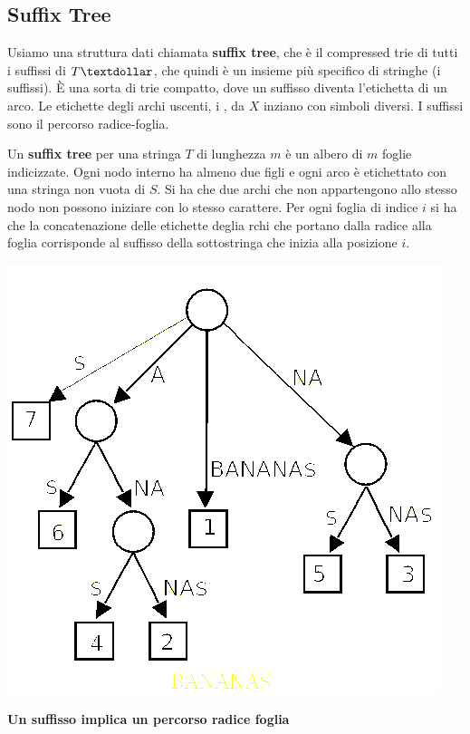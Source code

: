 \documentclass[a4paper,12pt, oneside]{book}
\begin{document}
\subsection{Suffix Tree}
Usiamo una struttura dati chiamata \textbf{suffix tree}, che è il
compressed trie di tutti i suffissi di $T\textdollar$, che quindi è un insieme più specifico di
stringhe (i suffissi). È una sorta di trie compatto, dove un suffisso
diventa l'etichetta di un arco. Le etichette degli archi uscenti, i
, da $X$ inziano con simboli diversi. I suffissi sono il
percorso radice-foglia.
\begin{definizione}
  Un \textbf{suffix tree} per una stringa $T$ di lunghezza $m$ è un albero di
  $m$ foglie indicizzate. Ogni nodo interno ha almeno due figli e ogni
  arco è etichettato con una stringa non vuota di $S$. Si ha che due
  archi che non appartengono allo stesso nodo non possono iniziare con
  lo stesso carattere. Per ogni foglia di indice $i$ si ha che la
  concatenazione delle etichette deglia rchi che portano dalla radice
  alla foglia corrisponde al suffisso della sottostringa che inizia
  alla posizione $i$.
\end{definizione}
\begin{center}
  \includegraphics[scale = 0.5]{img/suf.png}  
\end{center}
\textbf{Un suffisso implica un percorso radice foglia}\\
\end{document}

